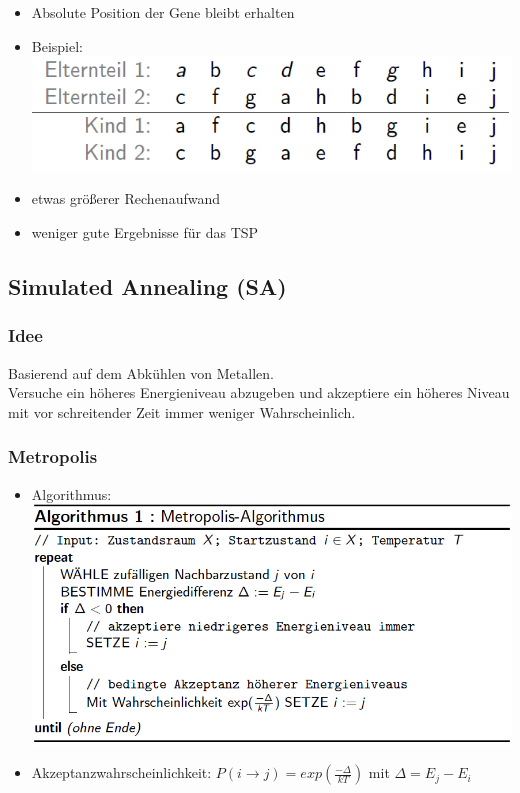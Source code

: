 \documentclass[12pt]{article}
\begin{document}
\begin{itemize}
						\begin{itemize}
							\item Absolute Position der Gene bleibt erhalten
							\item[] Beispiel:\\
								\includegraphics[scale=0.6]{CXExample}
							\item etwas größerer Rechenaufwand
							\item weniger gute Ergebnisse für das TSP
						\end{itemize}
				\end{itemize}
		\subsection{Simulated Annealing (SA)}
			\subsubsection{Idee}
				Basierend auf dem Abkühlen von Metallen.\\
				Versuche ein höheres Energieniveau abzugeben und akzeptiere ein höheres Niveau mit vor schreitender Zeit immer weniger Wahrscheinlich.
			\subsubsection{Metropolis}
				\begin{itemize}
					\item[] Algorithmus: \\
						\includegraphics[scale=0.6]{MetropolisAlgo}
					\item Akzeptanzwahrscheinlichkeit: $P(i\rightarrow j)= exp(\frac{-\Delta}{kT})$ mit $\Delta=E_j-E_i$
				\end{itemize}
\end{document}
